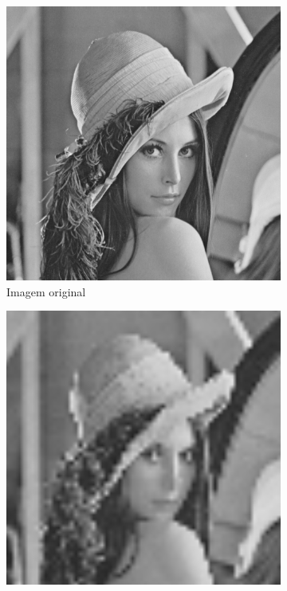 \documentclass[12pt, a4paper]{article}
\begin{document}
    \begin{figure}[h]
        \begin{subfigure}{.3\textwidth}
            \includegraphics[width=.95\textwidth]{../lenacropBW.png}
            \caption{Imagem original\\}
        \end{subfigure}
        \begin{subfigure}{.3\textwidth}
            \includegraphics[width=.95\textwidth]{../lenaBWBL7.png}

\end{subfigure}
\end{figure}
\end{document}
